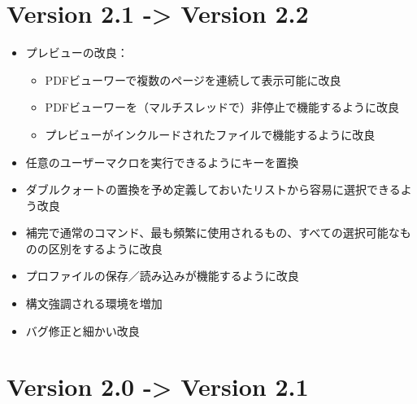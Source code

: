 \documentclass[]{book}
\begin{document}
\section{Version 2.1 -\textgreater{} Version 2.2}

\begin{itemize}
\item
  プレビューの改良：

  \begin{itemize}
  \item
    PDFビューワーで複数のページを連続して表示可能に改良
  \item
    PDFビューワーを（マルチスレッドで）非停止で機能するように改良
  \item
    プレビューがインクルードされたファイルで機能するように改良
  \end{itemize}
\item
  任意のユーザーマクロを実行できるようにキーを置換
\item
  ダブルクォートの置換を予め定義しておいたリストから容易に選択できるよう改良
\item
  補完で通常のコマンド、最も頻繁に使用されるもの、すべての選択可能なものの区別をするように改良
\item
  プロファイルの保存／読み込みが機能するように改良
\item
  構文強調される環境を増加
\item
  バグ修正と細かい改良
\end{itemize}

\section{Version 2.0 -\textgreater{} Version 2.1}
\end{document}
